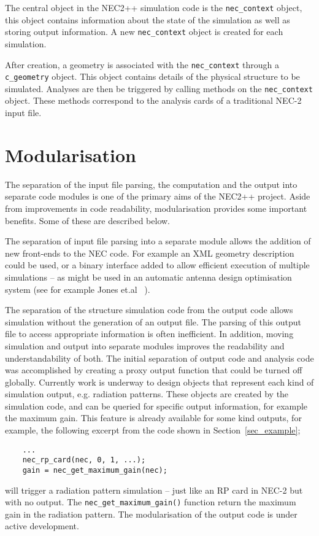 \documentclass{report}
\begin{document}
The central object in the NEC2++ simulation code is the {\tt nec\_context} object, this object contains information about the state of the simulation as well as storing output information. A new {\tt nec\_context} object is created for each simulation. 

After creation, a geometry is associated with the {\tt nec\_context} through a {\tt c\_geometry} object. This object contains details of the physical structure to be simulated. Analyses are then be triggered by calling methods on the {\tt nec\_context} object. These methods correspond to the analysis cards of a traditional NEC-2 input file.

\section{Modularisation}

The separation of the input file parsing, the computation and the output into separate code modules is one of the primary aims of the NEC2++ project. Aside from improvements in code readability, modularisation provides some important benefits. Some of these are described below. 

The separation of input file parsing into a separate module allows the addition of new front-ends to the NEC code. For example an XML geometry description could be used, or a binary interface added to allow efficient execution of multiple simulations -- as might be used in an automatic antenna design optimisation system (see for example Jones et.al ~\cite{Jones97}).

The separation of the structure simulation code from the output code allows simulation without the generation of an output file. The parsing of this output file to access appropriate information is often inefficient. In addition, moving simulation and output into separate modules improves the readability and understandability of both. The initial separation of output code and analysis code was accomplished by creating a proxy output function that could be turned off globally. Currently work is underway to design objects that represent each kind of simulation output, e.g. radiation patterns. These objects are created by the simulation code, and can be queried for specific output information, for example the maximum gain. This feature is already available for some kind outputs, for example, the following excerpt from the code shown in Section~\ref{sec_example};
\begin{lstlisting}
	...
	nec_rp_card(nec, 0, 1, ...);
	gain = nec_get_maximum_gain(nec);
\end{lstlisting}
will trigger a radiation pattern simulation -- just like an RP card in NEC-2 but with no output. The  {\tt nec\_get\_maximum\_gain()} function return the maximum gain in the radiation pattern. The modularisation of the output code is under active development.
\end{document}
